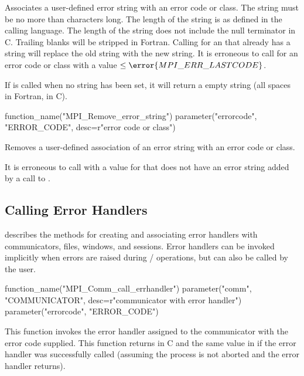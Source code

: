 Associates a user-defined error string with an error code or class.
The string must be no more than 
characters long.  The length of the string is as defined in the
calling language.  
The length of the string does not include the null terminator in C.
Trailing blanks will be stripped in Fortran.
Calling  for an 
that already has a string will replace the old string with the new
string.  It is erroneous to call  for
an error code or class with a value $\leq \error{MPI\_ERR\_LASTCODE}$.

If  is called when no string has been set,
it will return a empty string (all spaces in Fortran,  in C).


\begin{mpi-binding}
    function_name("MPI_Remove_error_string")
    parameter("errorcode", "ERROR_CODE", desc=r"error code or class")
\end{mpi-binding}

Removes a user-defined association of an error string with an error code or class.

It is erroneous to call  with a value for
 that does not have an error string added by a call to
.


\subsection{Calling Error Handlers}

 describes the methods for creating
and associating error handlers with communicators, files, windows, and sessions.
Error handlers can be invoked implicitly when errors are raised during
\mpi/ operations, but can also be called by the user.

\begin{mpi-binding}
    function_name("MPI_Comm_call_errhandler")
    parameter("comm", "COMMUNICATOR", desc=r"communicator with error handler")
    parameter("errorcode", "ERROR_CODE")
\end{mpi-binding}

This function invokes the error handler assigned to the communicator
with the error code supplied.  
This function returns  in C and the same
value in  if the error handler was successfully called
(assuming the process is not aborted and the error handler returns).

